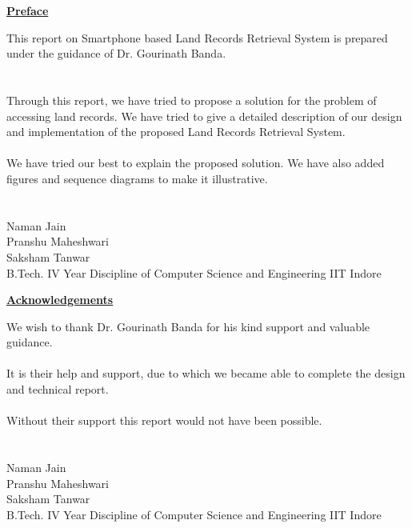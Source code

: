 \documentclass[12pt]{article}
\begin{document}

{
    \begin{center}
        \textbf{\underline{\large{Preface}}}
    \end{center}
    This report on Smartphone based Land Records Retrieval System is prepared under the guidance of Dr. Gourinath Banda.\\
    \\
    \\
    Through this report, we have tried to propose a solution for the problem of accessing land records. We have tried to give a detailed description of our design and implementation of the proposed Land Records Retrieval System.\\
    \\
    We have tried our best to explain the proposed solution. We have also added figures and sequence diagrams to make it illustrative.\\
    \\
    \\
    Naman Jain\\
    Pranshu Maheshwari\\
    Saksham Tanwar\\
    B.Tech. IV Year
    Discipline of Computer Science and Engineering
    IIT Indore 


    \thispagestyle{empty}
}

\clearpage


{
    \begin{center}
        \textbf{\underline{\large{Acknowledgements}}}
    \end{center}
    We wish to thank Dr. Gourinath Banda for his kind support and valuable guidance.\\
    \\
    It is their help and support, due to which we became able to complete the design and technical report.\\
    \\
    Without their support this report would not have been possible.\\
    \\
    \\
    Naman Jain\\
    Pranshu Maheshwari\\
    Saksham Tanwar\\
    B.Tech. IV Year
    Discipline of Computer Science and Engineering
    IIT Indore 
    \thispagestyle{empty}
}
\end{document}
